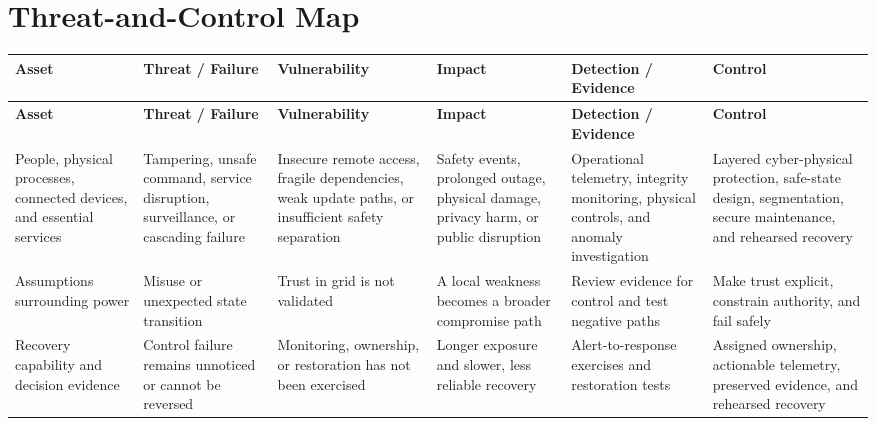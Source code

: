 \documentclass[11pt,letterpaper]{article}
\begin{document}
\section*{Threat-and-Control Map}
\begingroup\scriptsize\setlength{\tabcolsep}{2pt}
\begin{longtable}{>{\raggedright\arraybackslash}p{}>{\raggedright\arraybackslash}p{}>{\raggedright\arraybackslash}p{}>{\raggedright\arraybackslash}p{}>{\raggedright\arraybackslash}p{}>{\raggedright\arraybackslash}p{}}
\toprule\rowcolor{Navy}\color{white}\textbf{Asset} & \color{white}\textbf{Threat / Failure} & \color{white}\textbf{Vulnerability} & \color{white}\textbf{Impact} & \color{white}\textbf{Detection / Evidence} & \color{white}\textbf{Control}\\\midrule
\endfirsthead
\toprule\rowcolor{Navy}\color{white}\textbf{Asset} & \color{white}\textbf{Threat / Failure} & \color{white}\textbf{Vulnerability} & \color{white}\textbf{Impact} & \color{white}\textbf{Detection / Evidence} & \color{white}\textbf{Control}\\\midrule
\endhead
People, physical processes, connected devices, and essential services & Tampering, unsafe command, service disruption, surveillance, or cascading failure & Insecure remote access, fragile dependencies, weak update paths, or insufficient safety separation & Safety events, prolonged outage, physical damage, privacy harm, or public disruption & Operational telemetry, integrity monitoring, physical controls, and anomaly investigation & Layered cyber-physical protection, safe-state design, segmentation, secure maintenance, and rehearsed recovery\\\midrule
Assumptions surrounding power & Misuse or unexpected state transition & Trust in grid is not validated & A local weakness becomes a broader compromise path & Review evidence for control and test negative paths & Make trust explicit, constrain authority, and fail safely\\\midrule
Recovery capability and decision evidence & Control failure remains unnoticed or cannot be reversed & Monitoring, ownership, or restoration has not been exercised & Longer exposure and slower, less reliable recovery & Alert-to-response exercises and restoration tests & Assigned ownership, actionable telemetry, preserved evidence, and rehearsed recovery\\\midrule
\bottomrule
\end{longtable}
\endgroup
\end{document}
